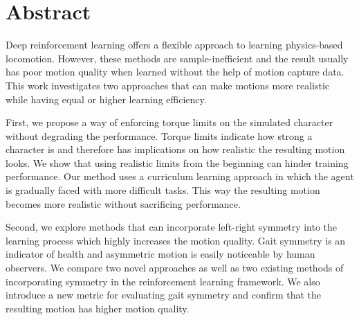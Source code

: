 
\chapter{Abstract}


Deep reinforcement learning offers a flexible approach to learning physics-based locomotion. However, these methods are sample-inefficient and the result usually has poor motion quality when learned without the help of motion capture data.
This work investigates two approaches that can make motions more realistic while having equal or higher learning efficiency.

First, we propose a way of enforcing torque limits on the simulated character without degrading the performance. Torque limits indicate how strong a character is and therefore has implications on how realistic the resulting motion looks. We show that using realistic limits from the beginning can hinder training performance. Our method uses a curriculum learning approach in which the agent is gradually faced with more difficult tasks. This way the resulting motion becomes more realistic without sacrificing performance.


Second, we explore methods that can incorporate left-right symmetry into the learning process which highly increases the motion quality. Gait symmetry is an indicator of health and asymmetric motion is easily noticeable by human observers. We compare two novel approaches as well as two existing methods of incorporating symmetry in the reinforcement learning framework. We also introduce a new metric for evaluating gait symmetry and confirm that the resulting motion has higher motion quality.






